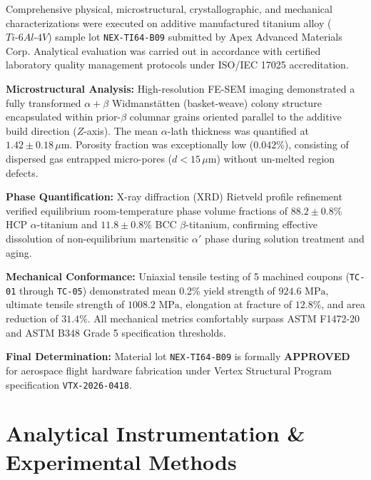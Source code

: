 \documentclass[10pt,a4paper,parskip=half]{scrartcl}
\begin{document}
\vspace{1mm}

\begin{tcolorbox}[title={\faInfoCircle\ Executive Summary \& Compliance Declaration}, colframe=brandsecondary, colback=white, left=8pt, right=8pt, top=6pt, bottom=6pt]
\small
Comprehensive physical, microstructural, crystallographic, and mechanical characterizations were executed on additive manufactured titanium alloy ($Ti\text{-}6Al\text{-}4V$) sample lot \texttt{NEX-TI64-B09} submitted by Apex Advanced Materials Corp. Analytical evaluation was carried out in accordance with certified laboratory quality management protocols under ISO/IEC 17025 accreditation.

\textbf{Microstructural Analysis:} High-resolution FE-SEM imaging demonstrated a fully transformed $\alpha+\beta$ Widmanstätten (basket-weave) colony structure encapsulated within prior-$\beta$ columnar grains oriented parallel to the additive build direction ($Z$-axis). The mean $\alpha$-lath thickness was quantified at $1.42 \pm 0.18\,\mu\text{m}$. Porosity fraction was exceptionally low ($0.042\%$), consisting of dispersed gas entrapped micro-pores ($d < 15\,\mu\text{m}$) without un-melted region defects.

\textbf{Phase Quantification:} X-ray diffraction (XRD) Rietveld profile refinement verified equilibrium room-temperature phase volume fractions of $88.2 \pm 0.8\%$ HCP $\alpha$-titanium and $11.8 \pm 0.8\%$ BCC $\beta$-titanium, confirming effective dissolution of non-equilibrium martensitic $\alpha'$ phase during solution treatment and aging.

\textbf{Mechanical Conformance:} Uniaxial tensile testing of 5 machined coupons (\texttt{TC-01} through \texttt{TC-05}) demonstrated mean 0.2\% yield strength of $924.6\text{ MPa}$, ultimate tensile strength of $1008.2\text{ MPa}$, elongation at fracture of $12.8\%$, and area reduction of $31.4\%$. All mechanical metrics comfortably surpass ASTM F1472-20 and ASTM B348 Grade 5 specification thresholds.

\textbf{Final Determination:} Material lot \texttt{NEX-TI64-B09} is formally \textbf{APPROVED} for aerospace flight hardware fabrication under Vertex Structural Program specification \texttt{VTX-2026-0418}.
\end{tcolorbox}

\vspace{2mm}

\section{Analytical Instrumentation \& Experimental Methods}
\end{document}
